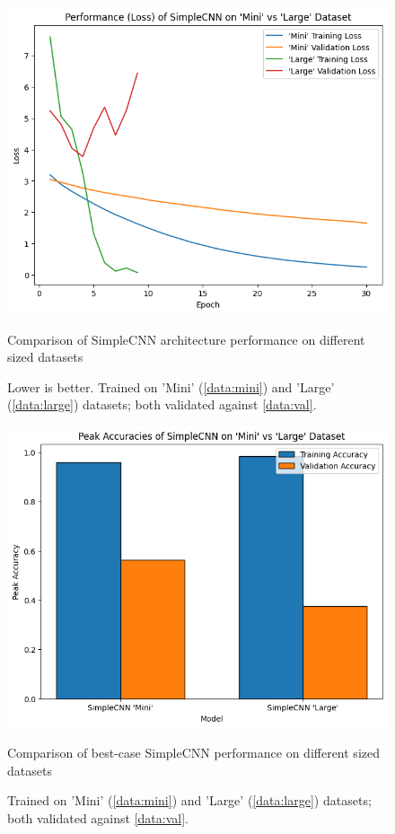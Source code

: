                 \begin{figure}[h]
                    \centering
                    \includegraphics[width=\textwidth]{images/SimpleCNNs_TrainLoss.png}
                    \caption{Comparison of SimpleCNN architecture performance on different sized datasets}
                    \label{fig:SimpleCNNs_TrainLoss-Mini_Train}
                    \caption*{Lower is better. Trained on 'Mini' (\ref{data:mini}) and 'Large' (\ref{data:large}) datasets; both validated against \ref{data:val}.}
                \end{figure}
        
                \begin{figure}[h]
                    \centering
                    \includegraphics[width=\textwidth]{images/SimpleCNNs_PeakAccuracy.png}
                    \caption{Comparison of best-case SimpleCNN performance on different sized datasets}
                    \label{fig:SimpleCNNs_PeakAccuracy-Mini_Train}
                    \caption*{Trained on 'Mini' (\ref{data:mini}) and 'Large' (\ref{data:large}) datasets; both validated against \ref{data:val}.}
                \end{figure}
    
